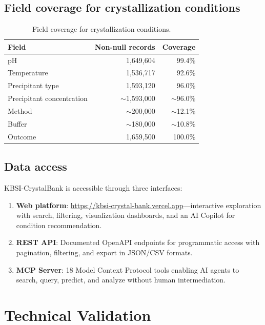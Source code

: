 \documentclass[11pt]{article}
\begin{document}
\subsection*{Field coverage for crystallization conditions}

\begin{table}[H]
\centering
\caption{Field coverage for crystallization conditions.}
\label{tab:coverage}
\small
\begin{tabular}{lrr}
\toprule
\textbf{Field} & \textbf{Non-null records} & \textbf{Coverage} \\
\midrule
pH & 1,649,604 & 99.4\% \\
Temperature & 1,536,717 & 92.6\% \\
Precipitant type & 1,593,120 & 96.0\% \\
Precipitant concentration & $\sim$1,593,000 & $\sim$96.0\% \\
Method & $\sim$200,000 & $\sim$12.1\% \\
Buffer & $\sim$180,000 & $\sim$10.8\% \\
Outcome & 1,659,500 & 100.0\% \\
\bottomrule
\end{tabular}
\end{table}

\subsection*{Data access}

KBSI-CrystalBank is accessible through three interfaces:
\begin{enumerate}
  \item \textbf{Web platform}: \url{https://kbsi-crystal-bank.vercel.app}---interactive exploration with search, filtering, visualization dashboards, and an AI Copilot for condition recommendation.
  \item \textbf{REST API}: Documented OpenAPI endpoints for programmatic access with pagination, filtering, and export in JSON/CSV formats.
  \item \textbf{MCP Server}: 18 Model Context Protocol tools enabling AI agents to search, query, predict, and analyze without human intermediation.
\end{enumerate}

\section*{Technical Validation}
\end{document}

